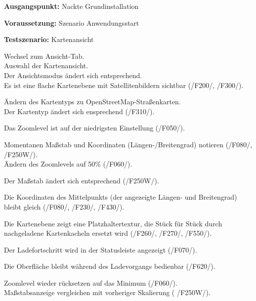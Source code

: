 \documentclass[10pt]{scrreprt}
\newcommand{\sfbf}[1]{\textbf{\sffamily #1}}
\newcommand{\ziel}[1]{{\fontsize{9.5}{11}\textsf{/#1/}}}
\newenvironment{details}[1][6pt]{%
  \parskip#1 \parindent6mm \raggedright%
  \def\item{\par\ignorespaces\hangindent=5mm \hangafter1}}{%
  \par\ignorespaces}
\begin{document}
\vspace{1.0cm}
\begin{details}[2pt]
\item \sfbf{Ausgangspunkt:} Nackte Grundinstallation 
\item \sfbf{Voraussetzung:} Szenario Anwendungsstart
\item \sfbf{Testszenario:} Kartenansicht
\end{details}
\vspace{2mm}
\begin{enumerate}[leftmargin = 2.2cm, resume]
\item Wechsel zum Ansicht-Tab.\\
Auswahl der Kartenansicht.\\Der Ansichtsmodus ändert sich entsprechend.\\
Es ist eine flache Kartenebene mit Satellitenbildern sichtbar (\ziel{F200}, \ziel{F300}).
\item Ändern des Kartentyps zu OpenStreetMap-Straßenkarten.\\Der Kartentyp ändert sich ensprechend (\ziel{F310}).
\item Das Zoomlevel ist auf der niedrigsten Einstellung (\ziel{F050}).
\item Momentanen Maßstab und Koordinaten (Längen-/Breitengrad) notieren (\ziel{F080}, \ziel{F250W}).\\Ändern des Zoomlevels auf 50\% (\ziel{F060}).\item Der Maßstab ändert sich entsprechend (\ziel{F250W}).
\item Die Koordinaten des Mittelpunkts (der angezeigte Längen- und Breitengrad) bleibt gleich (\ziel{F080}, \ziel{F230}, \ziel{F430}).
\item Die Kartenebene zeigt eine Platzhaltertextur, die Stück für Stück durch nachgeladene Kartenkacheln ersetzt wird (\ziel{F260}, \ziel{F270}, \ziel{F550}).
\item Der Ladefortschritt wird in der Statusleiste angezeigt (\ziel{F070}). \item Die Oberfläche bleibt während des Ladevorgangs bedienbar (\ziel{F620}).
\item Zoomlevel wieder rücksetzen auf das Minimum (\ziel{F060}).\\ Maßstabsanzeige vergleichen mit vorheriger Skalierung ( \ziel{F250W}).
\end{enumerate}
\end{document}
